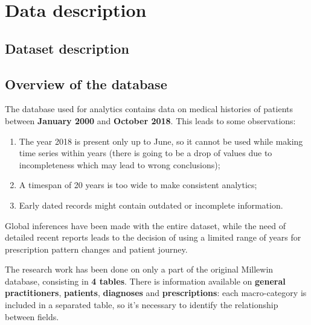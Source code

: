 \chapter{Data description}

\section{Dataset description}


\section{Overview of the database}
The database used for analytics contains data on medical histories of patients between \textbf{January 2000} and \textbf{October 2018}. This leads to some observations:
\begin{enumerate}
	\item The year 2018 is present only up to June, so it cannot be used while making time series within years (there is going to be a drop of values due to incompleteness which may lead to wrong conclusions);
	\item A timespan of 20 years is too wide to make consistent analytics;
	\item Early dated records might contain outdated or incomplete information.
\end{enumerate}

Global inferences have been made with the entire dataset, while the need of detailed recent reports leads to the decision of using a limited range of years for prescription pattern changes and patient journey.

The research work has been done on only a part of the original Millewin database, consisting in \textbf{4 tables}. There is information available on \textbf{general practitioners}, \textbf{patients}, \textbf{diagnoses} and \textbf{prescriptions}: each macro-category is included in a separated table, so it's necessary to identify the relationship between fields.

